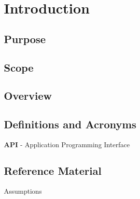 \documentclass[onecolumn, draftclsnofoot,10pt, compsoc]{IEEEtran}
\begin{document}
\newpage

\tableofcontents
\clearpage
\singlespace

\newpage


	\section{Introduction}
		\subsection{Purpose}
		\subsection{Scope}
		\subsection{Overview}
		\subsection{Definitions and Acronyms}
		\textbf{API} - Application Programming Interface
		\subsection{Reference Material}
			\begingroup
				\renewcommand{\addcontentsline}[3]{}%
				\renewcommand{\section}[2]{}%
				
				
			\endgroup

	\section{System Overview}
		\subsection{Assumptions}
\end{document}
